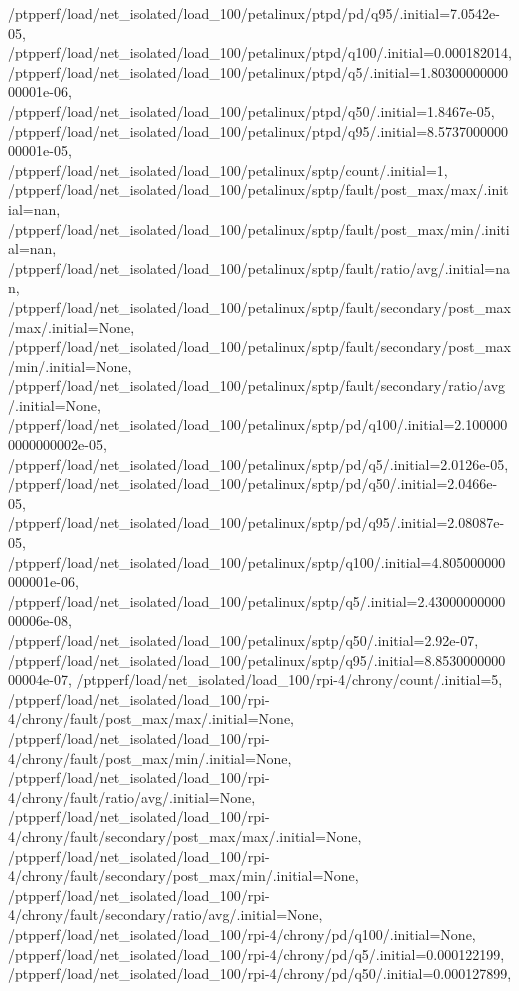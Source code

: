 {    /ptpperf/load/net_isolated/load_100/petalinux/ptpd/pd/q95/.initial=7.0542e-05,
    /ptpperf/load/net_isolated/load_100/petalinux/ptpd/q100/.initial=0.000182014,
    /ptpperf/load/net_isolated/load_100/petalinux/ptpd/q5/.initial=1.8030000000000001e-06,
    /ptpperf/load/net_isolated/load_100/petalinux/ptpd/q50/.initial=1.8467e-05,
    /ptpperf/load/net_isolated/load_100/petalinux/ptpd/q95/.initial=8.573700000000001e-05,
    /ptpperf/load/net_isolated/load_100/petalinux/sptp/count/.initial=1,
    /ptpperf/load/net_isolated/load_100/petalinux/sptp/fault/post_max/max/.initial=nan,
    /ptpperf/load/net_isolated/load_100/petalinux/sptp/fault/post_max/min/.initial=nan,
    /ptpperf/load/net_isolated/load_100/petalinux/sptp/fault/ratio/avg/.initial=nan,
    /ptpperf/load/net_isolated/load_100/petalinux/sptp/fault/secondary/post_max/max/.initial=None,
    /ptpperf/load/net_isolated/load_100/petalinux/sptp/fault/secondary/post_max/min/.initial=None,
    /ptpperf/load/net_isolated/load_100/petalinux/sptp/fault/secondary/ratio/avg/.initial=None,
    /ptpperf/load/net_isolated/load_100/petalinux/sptp/pd/q100/.initial=2.1000000000000002e-05,
    /ptpperf/load/net_isolated/load_100/petalinux/sptp/pd/q5/.initial=2.0126e-05,
    /ptpperf/load/net_isolated/load_100/petalinux/sptp/pd/q50/.initial=2.0466e-05,
    /ptpperf/load/net_isolated/load_100/petalinux/sptp/pd/q95/.initial=2.08087e-05,
    /ptpperf/load/net_isolated/load_100/petalinux/sptp/q100/.initial=4.805000000000001e-06,
    /ptpperf/load/net_isolated/load_100/petalinux/sptp/q5/.initial=2.4300000000000006e-08,
    /ptpperf/load/net_isolated/load_100/petalinux/sptp/q50/.initial=2.92e-07,
    /ptpperf/load/net_isolated/load_100/petalinux/sptp/q95/.initial=8.853000000000004e-07,
    /ptpperf/load/net_isolated/load_100/rpi-4/chrony/count/.initial=5,
    /ptpperf/load/net_isolated/load_100/rpi-4/chrony/fault/post_max/max/.initial=None,
    /ptpperf/load/net_isolated/load_100/rpi-4/chrony/fault/post_max/min/.initial=None,
    /ptpperf/load/net_isolated/load_100/rpi-4/chrony/fault/ratio/avg/.initial=None,
    /ptpperf/load/net_isolated/load_100/rpi-4/chrony/fault/secondary/post_max/max/.initial=None,
    /ptpperf/load/net_isolated/load_100/rpi-4/chrony/fault/secondary/post_max/min/.initial=None,
    /ptpperf/load/net_isolated/load_100/rpi-4/chrony/fault/secondary/ratio/avg/.initial=None,
    /ptpperf/load/net_isolated/load_100/rpi-4/chrony/pd/q100/.initial=None,
    /ptpperf/load/net_isolated/load_100/rpi-4/chrony/pd/q5/.initial=0.000122199,
    /ptpperf/load/net_isolated/load_100/rpi-4/chrony/pd/q50/.initial=0.000127899,
}
